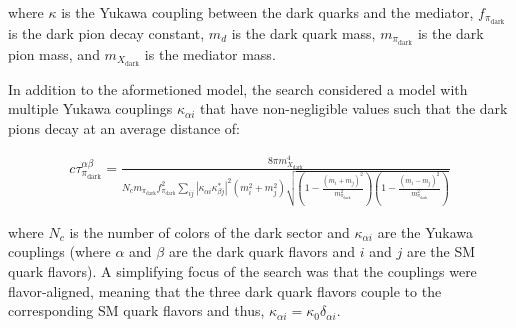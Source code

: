 \noindent where $\kappa$ is the Yukawa coupling between the dark quarks and the mediator, $f_{\pi_{\text{dark}}}$ is the dark pion decay constant, $m_d$ is the dark quark mass, $m_{\pi_{\text{dark}}}$ is the dark pion mass, and $m_{X_{\text{dark}}}$ is the mediator mass.

In addition to the aformetioned model, the search considered a model with multiple Yukawa couplings $\kappa_{\alpha i}$ that have non-negligible values such that the dark pions decay at an average distance of:

\begin{equation}
	\begin{aligned}
		c\tau_{\pi_{\text{dark}}}^{\alpha\beta} = \frac{
		8\pi m_{X_{\text{dark}}}^4
		}{
		N_c m_{\pi_{\text{dark}}}f^2_{\pi_{\text{dark}}} \sum_{ij}|\kappa_{\alpha i}\kappa_{\beta j}^{*}|^2 (m_i^2 + m_j^2) \sqrt{\left(1 - \frac{(m_i + m_j)^2}{m_{\pi_{\text{dark}}}^2}\right)\left(1-\frac{(m_i - m_j)^2}{m_{\pi_{\text{dark}}}^2}\right)}
		}
	\end{aligned}
\end{equation}

where $N_c$ is the number of colors of the dark sector and $\kappa_{\alpha i}$ are the Yukawa couplings (where $\alpha$ and $\beta$ are the dark quark flavors and $i$ and $j$ are the SM quark flavors). A simplifying focus of the search was that the couplings were flavor-aligned, meaning that the three dark quark flavors couple to the corresponding SM quark flavors and thus, $\kappa_{\alpha i} = \kappa_{0}\delta_{\alpha i}$.

